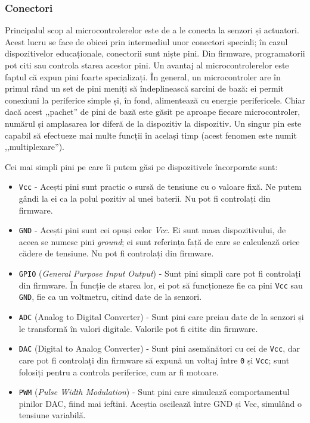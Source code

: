 \subsubsection{Conectori}
\label{sec:embed:micro-comp:micro:connect}

Principalul scop al microcontrolerelor este de a le conecta la senzori și
actuatori. Acest lucru se face de obicei prin intermediul unor conectori
speciali; în cazul dispozitivelor educaționale, conectorii sunt niște pini. Din
firmware, programatorii pot citi sau controla starea acestor pini. Un avantaj al
microcontrolerelor este faptul că expun pini foarte specializați. În
general, un microcontroler are în primul rând un set de pini meniți să
îndeplinească sarcini de bază: ei permit conexiuni la periferice simple și, în
fond, alimentează cu energie perifericele. Chiar dacă acest ,,pachet'' de pini de
bază este găsit pe aproape fiecare microcontroler, numărul și amplasarea lor
diferă de la dispozitiv la dispozitiv. Un singur pin este capabil să efectueze
mai multe funcții în același timp (acest fenomen este numit ,,multiplexare'').

Cei mai simpli pini pe care îi putem găsi pe dispozitivele încorporate sunt:

\begin{itemize}
  \item \texttt{Vcc} - Acești pini sunt practic o sursă de tensiune cu o valoare
    fixă. Ne putem gândi la ei ca la polul pozitiv al unei baterii.
    Nu pot fi controlați din firmware.
  \item \texttt{GND} - Acești pini sunt cei opuși celor \textit{Vcc}. Ei sunt masa
                dispozitivului, de aceea se numesc pini \textit{ground}; ei sunt
    referința față de care se calculează orice cădere de tensiune.
    Nu pot fi controlați din firmware.
  \item \texttt{GPIO}  (\textit{General Purpose
                Input Output}) - Sunt pini simpli care pot fi controlați din
    firmware. În funcție de starea lor, ei pot să funcționeze fie ca
                pini \texttt{Vcc} sau \texttt{GND}, fie ca un voltmetru, citind date de la senzori.
  \item \texttt{ADC}  (Analog to Digital
    Converter) - Sunt pini care preiau date de la senzori și le
    transformă în valori digitale. Valorile pot fi citite din
    firmware.
  \item \texttt{DAC}  (Digital to Analog
                Converter) - Sunt pini asemănători cu cei de \texttt{Vcc}, dar care pot
                fi controlați din firmware să expună un voltaj între \texttt{0} și \texttt{Vcc};
    sunt folosiți pentru a controla periferice, cum ar fi motoare.
  \item \texttt{PWM}  (\textit{Pulse Width Modulation})
    - Sunt pini care simulează comportamentul pinilor DAC, fiind mai
    ieftini. Aceștia oscilează între GND și Vcc, simulând o tensiune
    variabilă.
\end{itemize}

